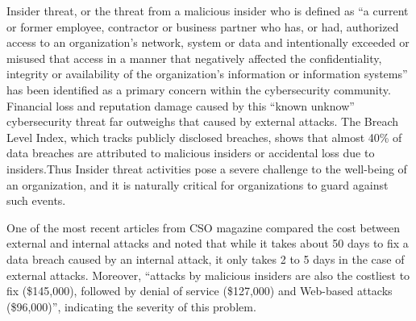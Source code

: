 \documentclass[conference]{IEEEtran}
\begin{document}
Insider threat, or the threat from a malicious insider who is defined as ``a current or former employee, contractor or business partner who has, or had, authorized access to an organization’s network, system or data and intentionally exceeded or misused that access in a manner that negatively affected the confidentiality, integrity or availability of the organization’s information or information systems''  \cite{b1} has been identified as a primary concern within the cybersecurity community. Financial loss and reputation damage caused by this ``known unknow'' cybersecurity threat far outweighs that caused by external attacks. The Breach Level Index, which tracks publicly disclosed breaches, shows that almost 40\% of data breaches are attributed to malicious insiders or accidental loss due to insiders\cite{b2}.Thus Insider threat activities pose a severe challenge to the well-being of an organization, and it is naturally critical for organizations to guard against such events.

One of the most recent articles from CSO magazine\cite{b3} compared the cost between external and internal attacks and noted that while it takes about 50 days to fix a data breach caused by an internal attack, it only takes 2 to 5 days in the case of external attacks. Moreover, “attacks by malicious insiders are also the costliest to fix (\$145,000), followed by denial of service (\$127,000) and Web-based attacks (\$96,000)”, indicating the severity of this problem.
\end{document}
